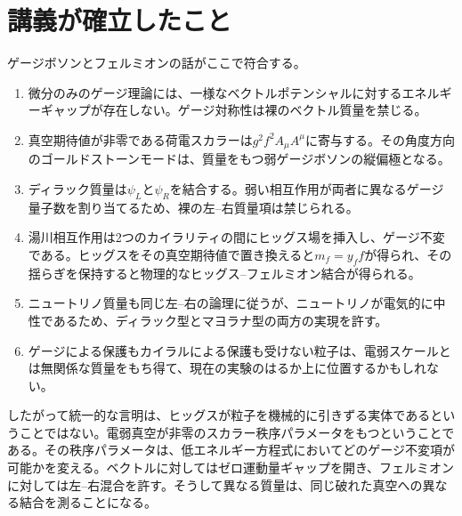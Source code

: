 \section{講義が確立したこと}

ゲージボソンとフェルミオンの話がここで符合する。

\begin{enumerate}
  \item 微分のみのゲージ理論には、一様なベクトルポテンシャルに対するエネルギーギャップが存在しない。ゲージ対称性は裸のベクトル質量を禁じる。
  \item 真空期待値が非零である荷電スカラーは\(g^2f^2A_\mu A^\mu\)に寄与する。その角度方向のゴールドストーンモードは、質量をもつ弱ゲージボソンの縦偏極となる。
  \item ディラック質量は\(\psi_L\)と\(\psi_R\)を結合する。弱い相互作用が両者に異なるゲージ量子数を割り当てるため、裸の左--右質量項は禁じられる。
  \item 湯川相互作用は2つのカイラリティの間にヒッグス場を挿入し、ゲージ不変である。ヒッグスをその真空期待値で置き換えると\(m_f=y_ff\)が得られ、その揺らぎを保持すると物理的なヒッグス--フェルミオン結合が得られる。
  \item ニュートリノ質量も同じ左--右の論理に従うが、ニュートリノが電気的に中性であるため、ディラック型とマヨラナ型の両方の実現を許す。
  \item ゲージによる保護もカイラルによる保護も受けない粒子は、電弱スケールとは無関係な質量をもち得て、現在の実験のはるか上に位置するかもしれない。
\end{enumerate}

したがって統一的な言明は、ヒッグスが粒子を機械的に引きずる実体であるということではない。電弱真空が非零のスカラー秩序パラメータをもつということである。その秩序パラメータは、低エネルギー方程式においてどのゲージ不変項が可能かを変える。ベクトルに対してはゼロ運動量ギャップを開き、フェルミオンに対しては左--右混合を許す。そうして異なる質量は、同じ破れた真空への異なる結合を測ることになる。